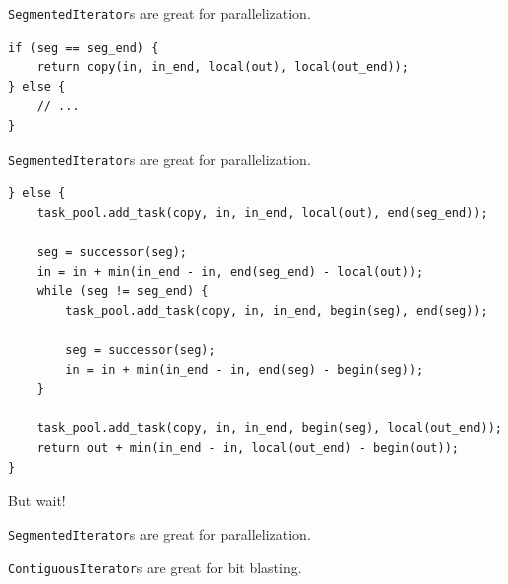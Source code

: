 \documentclass[aspectratio=169]{beamer}
\begin{document}

\begin{frame}[fragile]{\texttt{SegmentedIterator}s are great for
    parallelization.}
  \footnotesize
\begin{lstlisting}
if (seg == seg_end) {
    return copy(in, in_end, local(out), local(out_end));
} else {
    // ...
}
\end{lstlisting}
\end{frame}


\begin{frame}[fragile]{\texttt{SegmentedIterator}s are great for
    parallelization.}
  \footnotesize
\begin{lstlisting}
} else {
    task_pool.add_task(copy, in, in_end, local(out), end(seg_end));

    seg = successor(seg);
    in = in + min(in_end - in, end(seg_end) - local(out));
    while (seg != seg_end) {
        task_pool.add_task(copy, in, in_end, begin(seg), end(seg));

        seg = successor(seg);
        in = in + min(in_end - in, end(seg) - begin(seg));
    }

    task_pool.add_task(copy, in, in_end, begin(seg), local(out_end));
    return out + min(in_end - in, local(out_end) - begin(out));
}
\end{lstlisting}
\end{frame}


\begin{frame}[standout]
  But wait!
\end{frame}


\begin{frame}[standout]
  \texttt{SegmentedIterator}s are great for parallelization.
\end{frame}


\begin{frame}[standout]
  \texttt{ContiguousIterator}s are great for bit blasting.
\end{frame}
\end{document}
